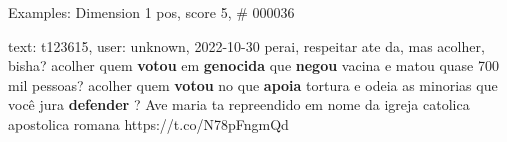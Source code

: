 \begin{frame}{Examples: Dimension 1 pos, score 5, \# 000036}
\footnotesize
\begin{exampleblock}{text: t123615, user: unknown, 2022-10-30}
perai, respeitar ate da, mas acolher, bisha? acolher quem \textbf{votou} em 
\textbf{genocida} que \textbf{negou} vacina e matou quase 700 mil pessoas? 
acolher quem \textbf{votou} no que \textbf{apoia} tortura e odeia as minorias 
que você jura \textbf{defender} ? Ave maria ta repreendido em nome da igreja 
catolica apostolica romana https://t.co/N78pFngmQd 
\end{exampleblock}
\end{frame}
